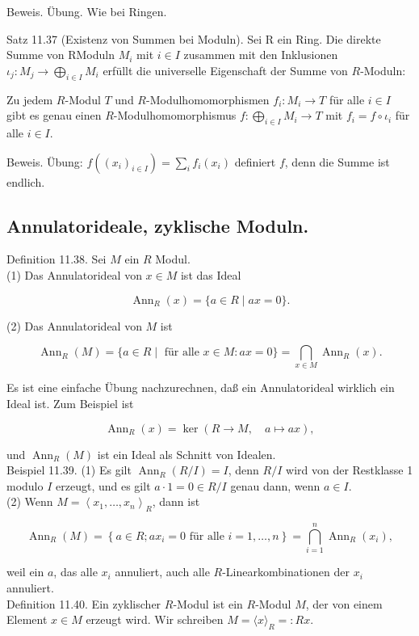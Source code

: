 \documentclass[10pt, letterpaper]{article}
\begin{document}
Beweis. Übung. Wie bei Ringen.

Satz 11.37 (Existenz von Summen bei Moduln). Sei R ein Ring. Die direkte Summe von RModuln $M_{i}$ mit $i \in I$ zusammen mit den Inklusionen $\iota_{j}: M_{j} \rightarrow \bigoplus_{i \in I} M_{i}$ erfüllt die universelle Eigenschaft der Summe von $R$-Moduln:

Zu jedem $R$-Modul $T$ und $R$-Modulhomomorphismen $f_{i}: M_{i} \rightarrow T$ für alle $i \in I$ gibt es genau einen $R$-Modulhomomorphismus $f: \bigoplus_{i \in I} M_{i} \rightarrow T$ mit $f_{i}=f \circ \iota_{i}$ für alle $i \in I$.

Beweis. Übung: $f\left(\left(x_{i}\right)_{i \in I}\right)=\sum_{i} f_{i}\left(x_{i}\right)$ definiert $f$, denn die Summe ist endlich.

\subsection*{Annulatorideale, zyklische Moduln.}
Definition 11.38. Sei $M$ ein $R$ Modul.\\
(1) Das Annulatorideal von $x \in M$ ist das Ideal

$$
\operatorname{Ann}_{R}(x)=\{a \in R \mid a x=0\} .
$$

(2) Das Annulatorideal von $M$ ist

$$
\operatorname{Ann}_{R}(M)=\{a \in R \mid \text { für alle } x \in M: a x=0\}=\bigcap_{x \in M} \operatorname{Ann}_{R}(x) .
$$

Es ist eine einfache Übung nachzurechnen, daß ein Annulatorideal wirklich ein Ideal ist. Zum Beispiel ist

$$
\operatorname{Ann}_{R}(x)=\operatorname{ker}(R \rightarrow M, \quad a \mapsto a x),
$$

und $\operatorname{Ann}_{R}(M)$ ist ein Ideal als Schnitt von Idealen.\\
Beispiel 11.39. (1) Es gilt $\operatorname{Ann}_{R}(R / I)=I$, denn $R / I$ wird von der Restklasse 1 modulo $I$ erzeugt, und es gilt $a \cdot 1=0 \in R / I$ genau dann, wenn $a \in I$.\\
(2) Wenn $M=\left\langle x_{1}, \ldots, x_{n}\right\rangle_{R}$, dann ist

$$
\operatorname{Ann}_{R}(M)=\left\{a \in R ; a x_{i}=0 \text { für alle } i=1, \ldots, n\right\}=\bigcap_{i=1}^{n} \operatorname{Ann}_{R}\left(x_{i}\right),
$$

weil ein $a$, das alle $x_{i}$ annuliert, auch alle $R$-Linearkombinationen der $x_{i}$ annuliert.\\
Definition 11.40. Ein zyklischer $R$-Modul ist ein $R$-Modul $M$, der von einem Element $x \in M$ erzeugt wird. Wir schreiben $M=\langle x\rangle_{R}=: R x$.
\end{document}
